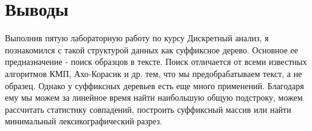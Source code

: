 \section{Выводы}

Выполнив пятую лабораторную работу по курсу Дискретный анализ, я познакомился с такой структурой данных как суффиксное дерево. Основное ее предназначение - поиск образцов в тексте. Поиск отличается от всеми известных алгоритмов КМП, Ахо-Корасик и др. тем, что мы предобрабатываем текст, а не образец.
Однако у суффиксных деревьев есть еще много применений. Благодаря ему мы можем за линейное время найти наибольшую общую подстроку, можем рассчитать статистику совпадений, построить суффиксный массив или найти минимальный лексикографический разрез.

